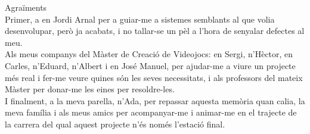 \newpage

{\LARGE Agraïments}
\\

Primer, a en Jordi Arnal per a guiar-me a sistemes semblants al que volia desenvolupar, però ja acabats, i no tallar-se un pèl a l'hora de senyalar defectes al meu.
\\

Als meus companys del Màster de Creació de Videojocs: en Sergi, n'Hèctor, en Carles, n'Eduard, n'Albert i en José Manuel, per ajudar-me a viure un projecte més real i fer-me veure quines són les seves necessitats, i als professors del mateix Màster per donar-me les eines per resoldre-les.
\\

I finalment, a la meva parella, n'Ada, per repassar aquesta memòria quan calia, la meva família i als meus amics per acompanyar-me i animar-me en el trajecte de la carrera del qual aquest projecte n'és només l'estació final.